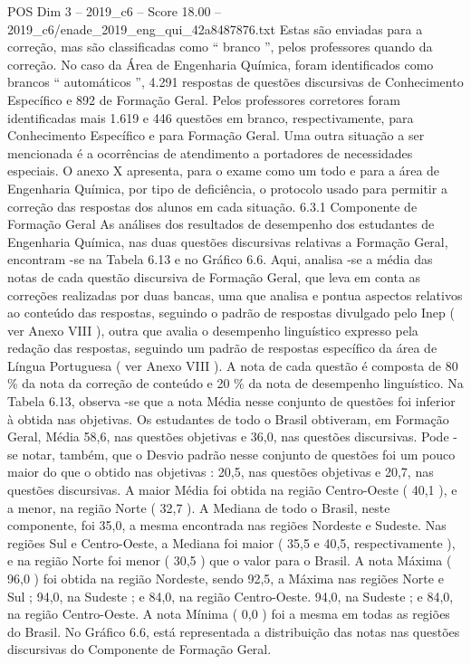 \begin{textsample}{POS Dim 3 – 2019\_c6 – Score 18.00 – 2019\_c6/enade\_2019\_eng\_qui\_42a8487876.txt}
Estas são enviadas para a correção, mas são classificadas como “ branco ”, pelos professores quando da correção.
No caso da Área de Engenharia Química, foram identificados como brancos “ automáticos ”, 4.291 respostas de questões discursivas de Conhecimento Específico e 892 de Formação Geral.
Pelos professores corretores foram identificadas mais 1.619 e 446 questões em branco, respectivamente, para Conhecimento Específico e para Formação Geral.
Uma outra situação a ser mencionada é a ocorrências de atendimento a portadores de necessidades especiais.
O anexo X apresenta, para o exame como um todo e para a área de Engenharia Química, por tipo de deficiência, o protocolo usado para permitir a correção das respostas dos alunos em cada situação. 6.3.1 Componente de Formação Geral As análises dos resultados de desempenho dos estudantes de Engenharia Química, nas duas questões discursivas relativas a Formação Geral, encontram -se na Tabela 6.13 e no Gráfico 6.6.
Aqui, analisa -se a média das notas de cada questão discursiva de Formação Geral, que leva em conta as correções realizadas por duas bancas, uma que analisa e pontua aspectos relativos ao conteúdo das respostas, seguindo o padrão de respostas divulgado pelo Inep ( ver Anexo VIII ), outra que avalia o desempenho linguístico expresso pela redação das respostas, seguindo um padrão de respostas específico da área de Língua Portuguesa ( ver Anexo VIII ).
A nota de cada questão é composta de 80 \% da nota da correção de conteúdo e 20 \% da nota de desempenho linguístico.
Na Tabela 6.13, observa -se que a nota Média nesse conjunto de questões foi inferior à obtida nas objetivas.
Os estudantes de todo o Brasil obtiveram, em Formação Geral, Média 58,6, nas questões objetivas e 36,0, nas questões discursivas.
Pode -se notar, também, que o Desvio padrão nesse conjunto de questões foi um pouco maior do que o obtido nas objetivas : 20,5, nas questões objetivas e 20,7, nas questões discursivas.
A maior Média foi obtida na região Centro-Oeste ( 40,1 ), e a menor, na região Norte ( 32,7 ).
A Mediana de todo o Brasil, neste componente, foi 35,0, a mesma encontrada nas regiões Nordeste e Sudeste.
Nas regiões Sul e Centro-Oeste, a Mediana foi maior ( 35,5 e 40,5, respectivamente ), e na região Norte foi menor ( 30,5 ) que o valor para o Brasil.
A nota Máxima ( 96,0 ) foi obtida na região Nordeste, sendo 92,5, a Máxima nas regiões Norte e Sul ; 94,0, na Sudeste ; e 84,0, na região Centro-Oeste. 94,0, na Sudeste ; e 84,0, na região Centro-Oeste.
A nota Mínima ( 0,0 ) foi a mesma em todas as regiões do Brasil.
No Gráfico 6.6, está representada a distribuição das notas nas questões discursivas do Componente de Formação Geral.

\end{textsample}
